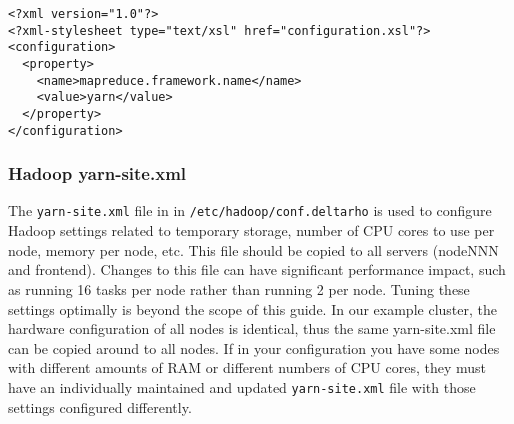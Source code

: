 \begin{verbatim}
<?xml version="1.0"?>
<?xml-stylesheet type="text/xsl" href="configuration.xsl"?>
<configuration>
  <property>
    <name>mapreduce.framework.name</name>
    <value>yarn</value>
  </property>
</configuration>
\end{verbatim}


\subsubsection{Hadoop yarn-site.xml}
The \verb|yarn-site.xml| file in in \verb|/etc/hadoop/conf.deltarho|
is used to configure Hadoop settings related to temporary storage, number
of CPU cores to use per node, memory per node, etc.   This file should
be copied to all servers (nodeNNN and frontend).  Changes to this file
can have significant performance impact, such as running 16 tasks per
node rather than running 2 per node.  Tuning these settings optimally
is beyond the scope of this guide.  In our example cluster, the hardware
configuration of all nodes is identical, thus the same yarn-site.xml file
can be copied around to all nodes.  If in your configuration you have some
nodes with different amounts of RAM or different numbers of CPU cores,
they must have an individually maintained and updated \verb|yarn-site.xml|
file with those settings configured differently.

